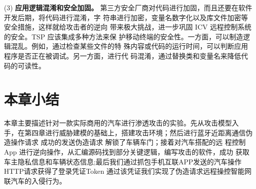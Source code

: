 (3) \textbf{应用逻辑混淆和安全加固。} 第三方安全厂商对代码进行加固，而且还要在软件开发后期，将代码进行混淆，字
符串进行加密，变量名数字化以及库文件加密等安全措施，这样就给攻击者的逆向
带来极大挑战，进一步巩固 ICV 远程控制系统的安全。TSP 应该集成多种方法来保
护移动终端的安全性。一方面，可以制造逻辑混乱。例如，通过检查某些文件的特
殊内容或代码的运行时间，可以判断应用程序是否正在被调试。另一方面，进行代
码混淆，通过替换类和变量名来降低代码的可读性。



\section{本章小结}
本章主要描述针对一款实际商用的汽车进行渗透攻击的实验。先从攻击模型入
手，在第四章进行威胁建模的基础上，搭建攻击环境；然后进行蓝牙近距离通信伪造操作请求 成功的发送伪造请求 解锁了车辆车门；接着对汽车搭配的远
程控制 App 进行逆向操作，从汇编源码找到部分关键逻辑，编写攻击的软件，成功
获取车主隐私信息和车辆状态信息;最后我们通过抓包手机互联APP发送的汽车操作HTTP请求获得了登录凭证Token
通过该凭证我们实现了伪造请求远程操控智能网联汽车的入侵行为。
